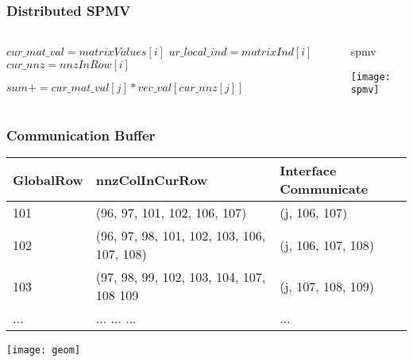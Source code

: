 \documentclass[mathserif]{beamer}
\begin{document}
\begin{frame}
\frametitle{Distributed SPMV}

\begin{columns}
\begin{column}{0.45\textwidth}
\begin{block}{}

\begin{algorithm}[H]
\tiny
\caption{SPMV}
\begin{algorithmic}[1]
	\State $cur\_mat\_val = matrixValues[i]$
	\State $ur\_local\_ind = matrixInd[i] $
	\State $cur\_nnz = nnzInRow[i] $

		\State $ sum += cur\_mat\_val[j] * vec\_val[cur\_nnz[j]] $
	\EndFor
\EndFor
\end{algorithmic}
\end{algorithm}
	
\end{block}
\end{column}
%
\begin{column}{0.45\textwidth}
\begin{block}{spmv}
\centerline{\texttt{[image: spmv]}}
\end{block}
\end{column}
\end{columns}

\end{frame}

\begin{frame}
\frametitle{Communication Buffer}

\begin{block}{}
	 	
\begin{center}
\tiny
	\begin{tabular}{|l |l |l |}
	\hline
	GlobalRow & nnzColInCurRow &   Interface Communicate \\ \hline
	101	&  (96, 97, 101, 102, 106, 107) & (j, 106, 107) \\ \hline
	102	&  (96, 97, 98, 101, 102, 103, 106, 107, 108) & (j, 106, 107, 108) \\ \hline
 	103	&  (97, 98, 99, 102, 103, 104, 107, 108 109 & (j, 107, 108, 109) \\ \hline
	...	& 	...	... 	...		&  ... \\
	\hline
	\end{tabular}
\end{center}
\end{block}

\begin{block}{}
\centerline{\texttt{[image: geom]}}
\end{block}

\end{frame}
\end{document}
